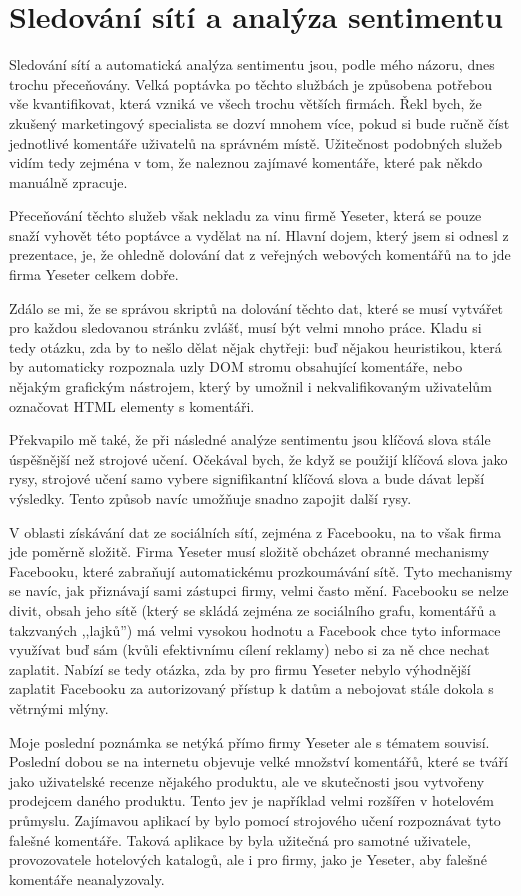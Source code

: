 \documentclass[12pt,a4paper]{report}
\begin{document}
\section*{Sledování sítí a analýza sentimentu}

Sledování sítí a automatická analýza sentimentu jsou, podle mého názoru, dnes
trochu přeceňovány. Velká poptávka po těchto službách je způsobena potřebou vše
kvantifikovat, která vzniká ve všech trochu větších firmách.  Řekl bych, že
zkušený marketingový specialista se dozví mnohem více, pokud si bude ručně
číst jednotlivé komentáře uživatelů na správném místě. Užitečnost podobných
služeb vidím tedy zejména v tom, že naleznou zajímavé komentáře, které pak
někdo manuálně zpracuje. 

Přeceňování těchto služeb však nekladu za vinu firmě Yeseter, která se pouze
snaží vyhovět této poptávce a vydělat na ní. Hlavní dojem, který jsem si odnesl
z prezentace, je, že ohledně dolování dat z veřejných webových komentářů na to
jde firma Yeseter celkem dobře. 

Zdálo se mi, že se správou skriptů na dolování těchto dat, které se musí
vytvářet pro každou sledovanou stránku zvlášť, musí být velmi mnoho práce.
Kladu si tedy otázku, zda by to nešlo dělat nějak chytřeji: buď nějakou
heuristikou, která by automaticky rozpoznala uzly DOM stromu obsahující
komentáře, nebo nějakým grafickým nástrojem, který by umožnil i
nekvalifikovaným uživatelům označovat HTML elementy s komentáři.

Překvapilo mě také, že při následné analýze sentimentu jsou klíčová slova stále
úspěšnější než strojové učení. Očekával bych, že když se použijí klíčová slova
jako rysy, strojové učení samo vybere signifikantní klíčová slova a bude dávat
lepší výsledky. Tento způsob navíc umožňuje snadno zapojit další rysy. 

V oblasti získávání dat ze sociálních sítí, zejména z Facebooku, na to však
firma jde poměrně složitě. Firma Yeseter musí složitě obcházet obranné
mechanismy Facebooku, které zabraňují automatickému prozkoumávání sítě.  Tyto
mechanismy se navíc, jak přiznávají sami zástupci firmy, velmi často mění.
Facebooku se nelze divit, obsah jeho sítě (který se skládá zejména ze
sociálního grafu, komentářů a takzvaných ,,lajků'') má velmi vysokou hodnotu a
Facebook chce tyto informace využívat buď sám (kvůli efektivnímu cílení
reklamy) nebo si za ně chce nechat zaplatit.  Nabízí se tedy otázka, zda by pro
firmu Yeseter nebylo výhodnější zaplatit Facebooku za autorizovaný přístup k
datům a nebojovat stále dokola s větrnými mlýny.

Moje poslední poznámka se netýká přímo firmy Yeseter ale s tématem souvisí.
Poslední dobou se na internetu objevuje velké množství komentářů, které se
tváří jako uživatelské recenze nějakého produktu, ale ve skutečnosti jsou
vytvořeny prodejcem daného produktu. Tento jev je například velmi rozšířen v
hotelovém průmyslu. Zajímavou aplikací by bylo pomocí strojového učení
rozpoznávat tyto falešné komentáře. Taková aplikace by byla užitečná pro
samotné uživatele, provozovatele hotelových katalogů, ale i pro firmy, jako je
Yeseter, aby falešné komentáře neanalyzovaly. 
\end{document}
